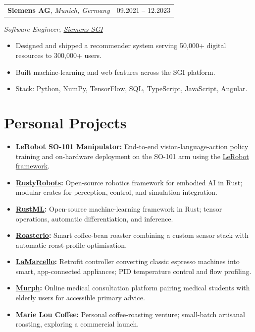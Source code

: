 \documentclass[11pt,a4paper]{article}
\makeatletter
\newcommand{\cventry}[3]{%
    \begin{tabularx}{\textwidth}{@{}Xr@{}}
        \textbf{#1}, \textit{#2} & #3 \\
    \end{tabularx}%
    \vspace{-0.35em}\par%
}
\makeatother
\begin{document}
\vspace{0.25em}
\cventry{Siemens AG}{Munich, Germany}{09.2021 -- 12.2023}
\textit{Software Engineer, \href{https://sgi.siemens.com/home}{Siemens SGI}}
\begin{itemize}
    \item Designed and shipped a recommender system serving 50{,}000+ digital resources to 300{,}000+ users.
    \item Built machine-learning and web features across the SGI platform.
    \item Stack: Python, NumPy, TensorFlow, SQL, TypeScript, JavaScript, Angular.
\end{itemize}

\section*{Personal Projects}

\begin{itemize}[itemsep=0.15em,topsep=0.2em]
    \item \textbf{LeRobot SO-101 Manipulator:} End-to-end vision-language-action policy training and on-hardware deployment on the SO-101 arm using the \href{https://github.com/huggingface/lerobot}{LeRobot framework}.
    \item \textbf{\href{https://github.com/MarcelKueck/RustyRobots}{RustyRobots}:} Open-source robotics framework for embodied AI in Rust; modular crates for perception, control, and simulation integration.
    \item \textbf{\href{https://github.com/MarcelKueck/RustML}{RustML}:} Open-source machine-learning framework in Rust; tensor operations, automatic differentiation, and inference.
    \item \textbf{\href{https://github.com/MarcelKueck/la_marcello}{Roasterio}:} Smart coffee-bean roaster combining a custom sensor stack with automatic roast-profile optimisation.
    \item \textbf{\href{https://github.com/MarcelKueck/la_marcello}{LaMarcello}:} Retrofit controller converting classic espresso machines into smart, app-connected appliances; PID temperature control and flow profiling.
    \item \textbf{\href{https://github.com/MarcelKueck/murph-app}{Murph}:} Online medical consultation platform pairing medical students with elderly users for accessible primary advice.
    \item \textbf{Marie Lou Coffee:} Personal coffee-roasting venture; small-batch artisanal roasting, exploring a commercial launch.
\end{itemize}
\end{document}
